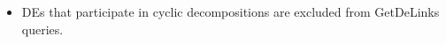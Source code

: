 
\begin{itemize}
\item DEs that participate in cyclic decompositions are excluded from GetDeLinks queries.
\end{itemize}
